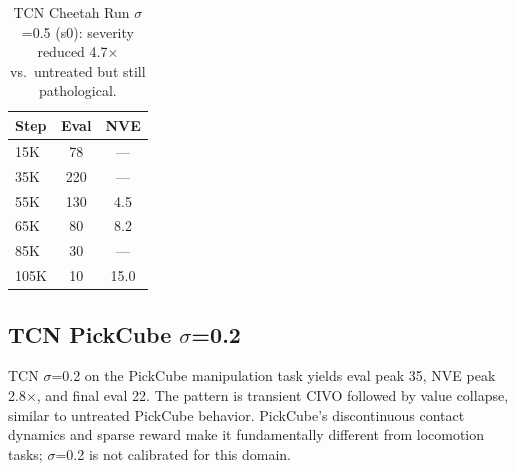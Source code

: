 \documentclass{article}
\begin{document}
\begin{table}[h]
\centering
\caption{TCN Cheetah Run $\sigma$=0.5 (s0): severity reduced 4.7$\times$ vs.\ untreated but still pathological.}
\label{tab:appendix-tcn-cheetah}
\begin{tabular}{lcc}
\toprule
\textbf{Step} & \textbf{Eval} & \textbf{NVE} \\
\midrule
15K & 78 & --- \\
35K & 220 & --- \\
55K & 130 & 4.5 \\
65K & 80 & 8.2 \\
85K & 30 & --- \\
105K & 10 & 15.0 \\
\bottomrule
\end{tabular}
\end{table}

\subsection{TCN PickCube $\sigma$=0.2}

TCN $\sigma$=0.2 on the PickCube manipulation task yields eval peak 35, NVE peak 2.8$\times$, and final eval 22.
The pattern is transient CIVO followed by value collapse, similar to untreated PickCube behavior.
PickCube's discontinuous contact dynamics and sparse reward make it fundamentally different from locomotion tasks; $\sigma$=0.2 is not calibrated for this domain.
\end{document}
